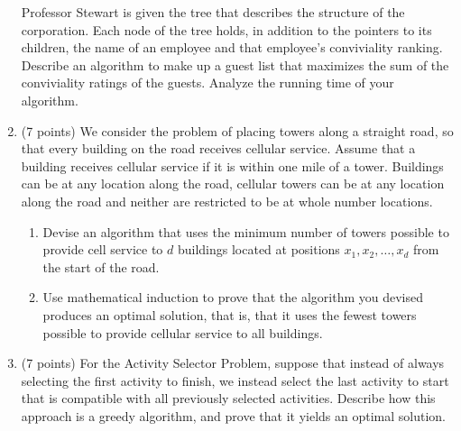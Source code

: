 \documentclass[5]{cs430homework}
\begin{document}
\begin{enumerate}[label=\arabic*.]
	Professor Stewart is given the tree that describes the structure of the corporation. Each node of the tree holds, in addition to the pointers to its children, the name of an employee and that employee's conviviality ranking. Describe an algorithm to make up a guest list that maximizes the sum of the conviviality ratings of the guests. Analyze the running time of your algorithm.
	\item (7 points) We consider the problem of placing towers along a straight road, so that every building on the road receives cellular service. Assume that a building receives cellular service if it is within one mile of a tower. Buildings can be at any location along the road, cellular towers can be at any location along the road and neither are restricted to be at whole number locations.
	\begin{enumerate}[label=\arabic{enumi}\alph*)]
	    \item Devise an algorithm that uses the minimum number of towers possible to provide cell service to $d$ buildings located at positions $x_{1}, x_{2}, \dots, x_{d}$ from the start of the road.
		\item Use mathematical induction to prove that the algorithm you devised produces an optimal solution, that is, that it uses the fewest towers possible to provide cellular service to all buildings.
	\end{enumerate}
	\item (7 points) For the Activity Selector Problem, suppose that instead of always selecting the first activity to finish, we instead select the last activity to start that is compatible with all previously selected activities. Describe how this approach is a greedy algorithm, and prove that it yields an optimal solution.
\end{enumerate}
\end{document}

